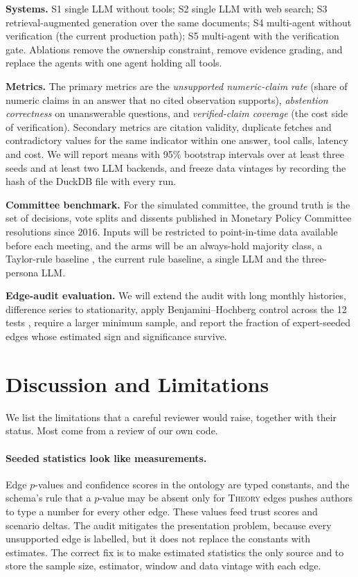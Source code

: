 \documentclass[conference]{IEEEtran}
\begin{document}
\textbf{Systems.} S1 single LLM without tools; S2 single LLM with web search; S3 retrieval-augmented generation over the same documents; S4 multi-agent without verification (the current production path); S5 multi-agent with the verification gate. Ablations remove the ownership constraint, remove evidence grading, and replace the agents with one agent holding all tools.

\textbf{Metrics.} The primary metrics are the \emph{unsupported numeric-claim rate} (share of numeric claims in an answer that no cited observation supports), \emph{abstention correctness} on unanswerable questions, and \emph{verified-claim coverage} (the cost side of verification). Secondary metrics are citation validity, duplicate fetches and contradictory values for the same indicator within one answer, tool calls, latency and cost. We will report means with 95\% bootstrap intervals over at least three seeds and at least two LLM backends, and freeze data vintages by recording the hash of the DuckDB file with every run.

\textbf{Committee benchmark.} For the simulated committee, the ground truth is the set of decisions, vote splits and dissents published in Monetary Policy Committee resolutions since 2016. Inputs will be restricted to point-in-time data available before each meeting, and the arms will be an always-hold majority class, a Taylor-rule baseline \cite{taylor1993}, the current rule baseline, a single LLM and the three-persona LLM.

\textbf{Edge-audit evaluation.} We will extend the audit with long monthly histories, difference series to stationarity, apply Benjamini--Hochberg control across the 12 tests \cite{bh1995}, require a larger minimum sample, and report the fraction of expert-seeded edges whose estimated sign and significance survive.

\section{Discussion and Limitations}
\label{sec:discussion}

We list the limitations that a careful reviewer would raise, together with their status. Most come from a review of our own code.

\paragraph{Seeded statistics look like measurements.}
Edge $p$-values and confidence scores in the ontology are typed constants, and the schema's rule that a $p$-value may be absent only for \textsc{Theory} edges pushes authors to type a number for every other edge. These values feed trust scores and scenario deltas. The audit mitigates the presentation problem, because every unsupported edge is labelled, but it does not replace the constants with estimates. The correct fix is to make estimated statistics the only source and to store the sample size, estimator, window and data vintage with each edge.
\end{document}
